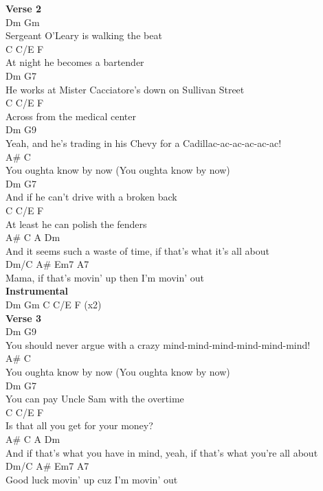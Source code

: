 \documentclass[a4paper]{article}
\begin{document}
{{        }
        \textbf{Verse 2}
        ~\\
        {
            \cutive
            \obeyspaces
Dm                   Gm
\\
Sergeant O'Leary is walking the beat
\\
   C           C/E       F
\\
At night he becomes a bartender
\\
            Dm                          G7
\\
He works at Mister Cacciatore's down on Sullivan Street
\\
 C               C/E     F
\\
Across from the medical center
\\
               Dm                         G9
\\
Yeah, and he's trading in his Chevy for a Cadillac-ac-ac-ac-ac-ac!
\\
A\#                  C
\\
You oughta know by now (You oughta know by now)
\\
    Dm                       G7
\\
And if he can't drive with a broken back
\\
   C            C/E           F
\\
At least he can polish the fenders
\\
       A\#                    C        A                    Dm
\\
And it seems such a waste of time, if that's what it's all about
\\
Dm/C        A\#                  Em7 A7
\\
Mama, if that's movin' up then I'm      movin' out
\\

        }
        \textbf{Instrumental}
        ~\\
        {
            \cutive
            \obeyspaces
Dm  Gm  C C/E F  (x2)
\\

        }
        \textbf{Verse 3}
        ~\\
        {
            \cutive
            \obeyspaces
Dm                            G9
\\
You should never argue with a crazy mind-mind-mind-mind-mind-mind!
\\
A\#                  C
\\
You oughta know by now (You oughta know by now)
\\
         Dm                     G7
\\
You can pay Uncle Sam with the overtime
\\
   C            C/E            F
\\
Is that all you get for your money?
\\
       A\#                       C             A                      Dm
\\
And if that's what you have in mind, yeah, if that's what you're all about
\\
Dm/C   A\#               Em7  A7
\\
Good luck movin' up cuz I'm      movin' out
\\

}}
\end{document}
